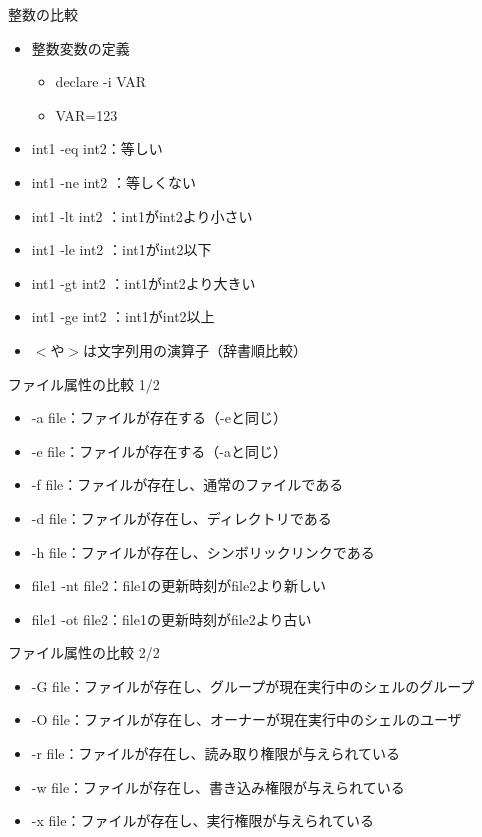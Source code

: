 \documentclass[12pt,aspectratio=169]{beamer}
\begin{document}
\begin{frame}{整数の比較}

  \begin{itemize}
    \item 整数変数の定義
      \begin{itemize}
        \item declare -i VAR
        \item VAR=123
      \end{itemize}

    \item int1 -eq int2：等しい
    \item int1 -ne int2 ：等しくない
    \item int1 -lt int2 ：int1がint2より小さい
    \item int1 -le int2 ：int1がint2以下
    \item int1 -gt int2 ：int1がint2より大きい
    \item int1 -ge int2 ：int1がint2以上
    \vspace{0.5cm}
    \item $<$や$>$は文字列用の演算子（辞書順比較）
  \end{itemize}

\end{frame}

\begin{frame}{ファイル属性の比較 1/2}

  \begin{itemize}
    \item -a file：ファイルが存在する（-eと同じ）
    \item -e file：ファイルが存在する（-aと同じ）
    \item -f file：ファイルが存在し、通常のファイルである
    \item -d file：ファイルが存在し、ディレクトリである
    \item -h file：ファイルが存在し、シンボリックリンクである
    \item file1 -nt file2：file1の更新時刻がfile2より新しい
    \item file1 -ot file2：file1の更新時刻がfile2より古い
  \end{itemize}

\end{frame}

\begin{frame}{ファイル属性の比較 2/2}

  \begin{itemize}
    \item -G file：ファイルが存在し、グループが現在実行中のシェルのグループ
    \item -O file：ファイルが存在し、オーナーが現在実行中のシェルのユーザ
    \item -r file：ファイルが存在し、読み取り権限が与えられている
    \item -w file：ファイルが存在し、書き込み権限が与えられている
    \item -x file：ファイルが存在し、実行権限が与えられている
  \end{itemize}

\end{frame}
\end{document}
